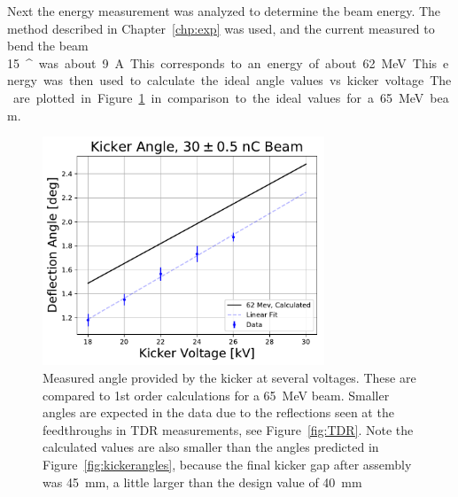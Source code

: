 \documentclass[aps,prab,preprint,groupedaddress,linenumbers]{revtex4-2}
\begin{document}
Next the energy measurement was analyzed to determine the beam energy. 
The method described in Chapter~\ref{chp:exp} was used, 
and the current measured to bend the beam \SI{15}{^\circ} was about \SI{9}{A}.
This corresponds to an energy of about \SI{62}{MeV}. 
This energy was then used to calculate the ideal angle values vs. kicker voltage.
The are plotted in Figure~\ref{fig:angles} in comparison 
to the ideal values for a \SI{65}{MeV} beam. 
\begin{figure}
	\centering
	\includegraphics[width=0.75\textwidth]{kicker_angle_comparison}
	\caption{Measured angle provided by the kicker at several voltages.  
		These are compared to 1st order calculations for a \SI{65}{MeV} beam.
		Smaller angles are expected in the data due to the reflections
		seen at the feedthroughs in TDR measurements, see Figure~\ref{fig:TDR}.
		Note the calculated values are also smaller than the 
		angles predicted in Figure~\ref{fig:kickerangles}, 
		because the final kicker gap after assembly was \SI{45}{mm}, a little larger
		than the design value of \SI{40}{mm}}
	\label{fig:angles}
\end{figure}
\end{document}
